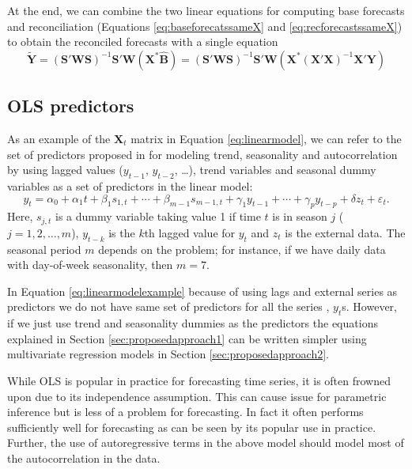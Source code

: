 \documentclass[11pt,a4paper,]{article}
\begin{document}
At the end, we can combine the two linear equations for computing base
forecasts and reconciliation (Equations \eqref{eq:baseforecatssameX} and
\eqref{eq:recforecastssameX}) to obtain the reconciled forecasts with a
single equation \begin{equation}\label{eq:singlestepsameX}
\tilde{\bm{Y}} = (\bm{S}'\bm{W}\bm{S})^{-1}\bm{S}'\bm{W}
                        (\bm{X}^* \hat{\bm{B}})
                        = (\bm{S}'\bm{W}\bm{S})^{-1}\bm{S}'\bm{W}
                        (\bm{X}^* (\bm{X}'\bm{X})^{-1} \bm{X}'\bm{Y})
\end{equation}

\hypertarget{ols-predictors}{%
\subsection{OLS predictors}\label{ols-predictors}}

As an example of the \(\bm{X}_t\) matrix in Equation
\eqref{eq:linearmodel}, we can refer to the set of predictors proposed in
\textcite{ashouri2018} for modeling trend, seasonality and
autocorrelation by using lagged values (\(y_{t-1}\), \(y_{t-2}\),
\dots), trend variables and seasonal dummy variables as a set of
predictors in the linear model:
\begin{equation}\label{eq:linearmodelexample}
    y_t = \alpha_0 + \alpha_1 t + \beta_1 s_{1,t} + \cdots + \beta_{m-1} s_{m-1,t} + \gamma_1 y_{t-1} + \cdots + \gamma_p y_{t-p} + \delta z_t + \varepsilon_t.
\end{equation} Here, \(s_{j,t}\) is a dummy variable taking value 1 if
time \(t\) is in season \(j\) (\(j=1, 2, \dots, m\)), \(y_{t-k}\) is the
\(k\)th lagged value for \(y_t\) and \(z_t\) is the external data. The
seasonal period \(m\) depends on the problem; for instance, if we have
daily data with day-of-week seasonality, then \(m=7\).

In Equation \eqref{eq:linearmodelexample} because of using lags and
external series as predictors we do not have same set of predictors for
all the series , \(y_t\)s. However, if we just use trend and seasonality
dummies as the predictors the equations explained in Section
\ref{sec:proposedapproach1} can be written simpler using multivariate
regression models in Section \ref{sec:proposedapproach2}.

While OLS is popular in practice for forecasting time series, it is
often frowned upon due to its independence assumption. This can cause
issue for parametric inference but is less of a problem for forecasting.
In fact it often performs sufficiently well for forecasting as can be
seen by its popular use in practice. Further, the use of autoregressive
terms in the above model should model most of the autocorrelation in the
data.
\end{document}
